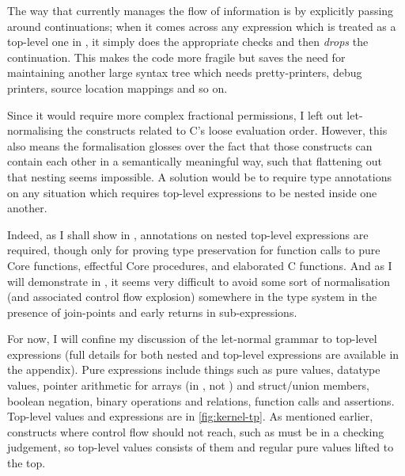 The way that  currently manages the flow of information is by explicitly
passing around continuations; when it comes across any expression which is
treated as a top-level one in , it simply does the appropriate
checks and then \emph{drops} the continuation.\label{sn:use-conts}
This makes the code more fragile but saves the need for maintaining another large
syntax tree which needs pretty-printers, debug printers, source location
mappings and so on.

Since it would require more complex fractional permissions, I left out
let-normalising the constructs related to C's loose evaluation order. However, this also means the formalisation glosses %
over the fact that those constructs can contain each other in a semantically
meaningful way, such that flattening out that nesting seems impossible. A
solution would be to require type annotations on any situation which requires
top-level expressions to be nested inside one another.

Indeed, as I shall show in , annotations on
nested top-level expressions are required, though only for proving type
preservation for function calls to pure Core functions, effectful Core
procedures, and elaborated C functions. And as I will demonstrate in
, it seems very difficult to avoid some sort
of normalisation (and associated control flow explosion) somewhere in the type
system in the presence of join-points and early returns in sub-expressions.

For now, I will confine my discussion of the let-normal grammar to top-level
expressions (full details for both nested and top-level expressions are
available in the appendix). Pure expressions include things such as pure values,
datatype values, pointer arithmetic for arrays (in , not )
and struct/union members, boolean negation, binary operations and relations, function
calls and assertions. Top-level values and expressions are in
\cref{fig:kernel-tp}. As mentioned earlier, constructs where control flow
should not reach, such as  must be in a checking %
judgement, so top-level values consists of them and regular pure values lifted
to the top.


